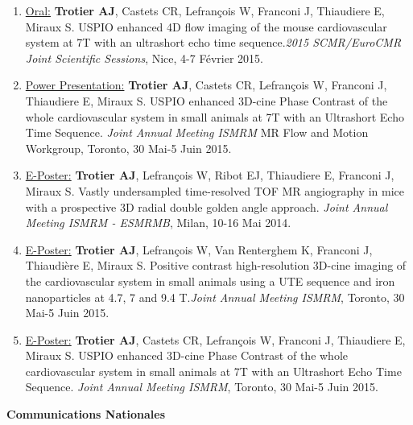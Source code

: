 \begin{enumerate}
\item \underline{Oral:} \textbf{Trotier AJ}, Castets CR, Lefrançois W, Franconi J, Thiaudiere E, Miraux S. USPIO enhanced 4D flow imaging of the mouse cardiovascular system at 7T with an ultrashort echo time sequence.\textit{2015 SCMR/EuroCMR Joint Scientific Sessions}, Nice, 4-7 Février 2015.
\item \underline{Power Presentation:} \textbf{Trotier AJ}, Castets CR, Lefrançois W, Franconi J, Thiaudiere E, Miraux S. USPIO enhanced 3D-cine Phase Contrast of the whole cardiovascular system in small animals at 7T with an Ultrashort Echo Time Sequence. \textit{Joint Annual Meeting ISMRM} MR Flow and Motion Workgroup, Toronto, 30 Mai-5 Juin 2015. 
\vspace{1.5em}
\item  \underline{E-Poster:} \textbf{Trotier AJ}, Lefrançois W, Ribot EJ, Thiaudiere E, Franconi J, Miraux S. Vastly undersampled time-resolved TOF MR angiography in mice with a prospective 3D radial double golden angle approach. \textit{Joint Annual Meeting ISMRM - ESMRMB}, Milan, 10-16 Mai 2014. 
\item  \underline{E-Poster:} \textbf{Trotier AJ}, Lefrançois W, Van Renterghem K, Franconi J, Thiaudière E, Miraux S. Positive contrast high-resolution 3D-cine imaging of the cardiovascular system in small animals using a UTE sequence and iron nanoparticles at 4.7, 7 and 9.4 T.\textit{Joint Annual Meeting ISMRM}, Toronto, 30 Mai-5 Juin 2015. 
\item  \underline{E-Poster:} \textbf{Trotier AJ}, Castets CR, Lefrançois W, Franconi J, Thiaudiere E, Miraux S. USPIO enhanced 3D-cine Phase Contrast of the whole cardiovascular system in small animals at 7T with an Ultrashort Echo Time Sequence. \textit{Joint Annual Meeting ISMRM}, Toronto, 30 Mai-5 Juin 2015. 
\end{enumerate}

\vspace{2em}
\normalsize \textbf{Communications Nationales}
\vspace{1em}

